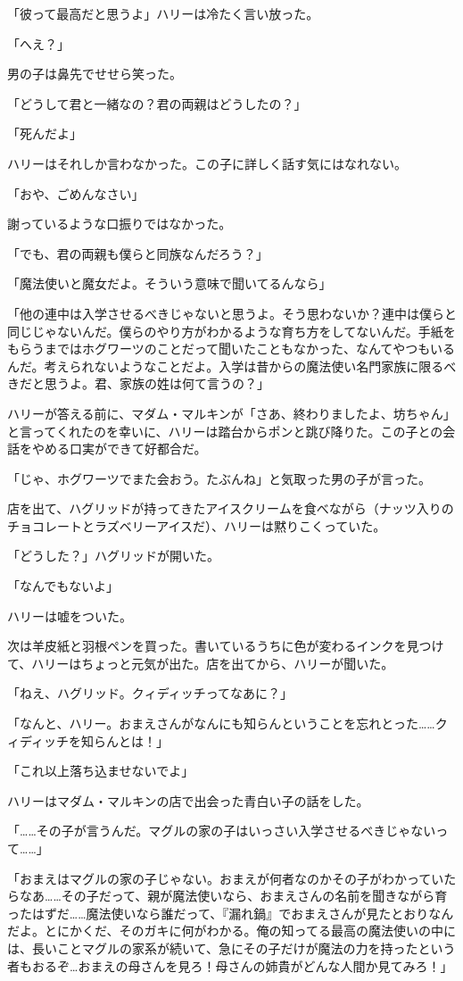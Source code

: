 \documentclass[10pt,a4paper]{article}
\begin{document}
\begin{CJK}{UTF8}{min}
「彼って最高だと思うよ」ハリーは冷たく言い放った。

「へえ？」

男の子は鼻先でせせら笑った。

「どうして君と一緒なの？君の両親はどうしたの？」

「死んだよ」

ハリーはそれしか言わなかった。この子に詳しく話す気にはなれない。

「おや、ごめんなさい」

謝っているような口振りではなかった。

「でも、君の両親も僕らと同族なんだろう？」

「魔法使いと魔女だよ。そういう意味で聞いてるんなら」

「他の連中は入学させるべきじゃないと思うよ。そう思わないか？連中は僕らと同じじゃないんだ。僕らのやり方がわかるような育ち方をしてないんだ。手紙をもらうまではホグワーツのことだって聞いたこともなかった、なんてやつもいるんだ。考えられないようなことだよ。入学は昔からの魔法使い名門家族に限るべきだと思うよ。君、家族の姓は何て言うの？」

ハリーが答える前に、マダム・マルキンが「さあ、終わりましたよ、坊ちゃん」と言ってくれたのを幸いに、ハリーは踏台からポンと跳び降りた。この子との会話をやめる口実ができて好都合だ。

「じゃ、ホグワーツでまた会おう。たぶんね」と気取った男の子が言った。

店を出て、ハグリッドが持ってきたアイスクリームを食べながら（ナッツ入りのチョコレートとラズベリーアイスだ）、ハリーは黙りこくっていた。

「どうした？」ハグリッドが開いた。

「なんでもないよ」

ハリーは嘘をついた。

次は羊皮紙と羽根ペンを買った。書いているうちに色が変わるインクを見つけて、ハリーはちょっと元気が出た。店を出てから、ハリーが聞いた。

「ねえ、ハグリッド。クィディッチってなあに？」

「なんと、ハリー。おまえさんがなんにも知らんということを忘れとった……クィディッチを知らんとは！」

「これ以上落ち込ませないでよ」

ハリーはマダム・マルキンの店で出会った青白い子の話をした。

「……その子が言うんだ。マグルの家の子はいっさい入学させるべきじゃないって……」

「おまえはマグルの家の子じゃない。おまえが何者なのかその子がわかっていたらなあ……その子だって、親が魔法使いなら、おまえさんの名前を聞きながら育ったはずだ……魔法使いなら誰だって、『漏れ鍋』でおまえさんが見たとおりなんだよ。とにかくだ、そのガキに何がわかる。俺の知ってる最高の魔法使いの中には、長いことマグルの家系が続いて、急にその子だけが魔法の力を持ったという者もおるぞ…おまえの母さんを見ろ！母さんの姉貴がどんな人間か見てみろ！」


\end{CJK}
\end{document}
